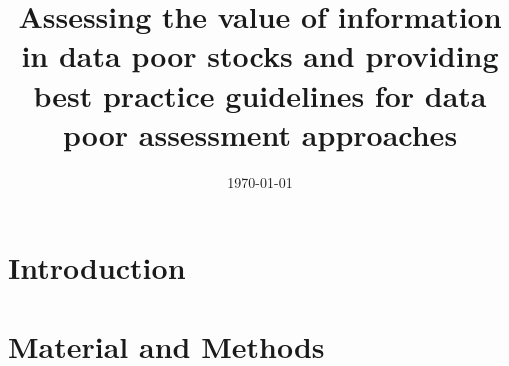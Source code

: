 \documentclass[12pt,halfline,a4paper]{ouparticle}
\begin{document}
\title{Assessing the value of information in data poor stocks and providing best practice guidelines for data poor assessment approaches}

\author{
\address{ Centre for Environmental Policy, Imperial College London, Weeks Building, 16-18 Princes Gardens, London\\ SW7 1NE, UK}
\and
{}
\address{Food and Agricultural Organization, Fishery and Aquaculture Policy and Resources Division, Rome, Lazio,\\
00153, Italy}
\and
{}
\address{Joint Research Centre (JRC), European Commission, TP 051, Via Enrico Fermi 2749, 21027 Ispra, VA, \\Italy.}
}

\abstract{%
}

\date{\today}


\maketitle
\section{Introduction}\label{intro}


\section{Material and Methods}\label{MaM}

\end{document}
